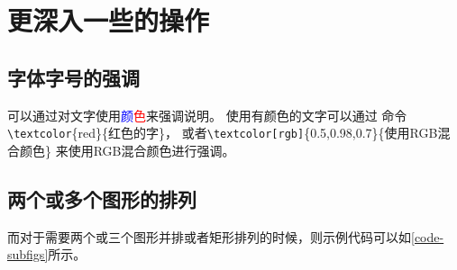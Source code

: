 \section{更深入一些的操作}
\label{sec-more}
\subsection{字体字号的强调}
\label{subsec-morefont}
可以通过对文字使用\textcolor{blue}{颜}\textcolor{red}{色}来强调说明。
使用\textcolor[rgb]{0.5,0.95,0.96}{有颜色的文字}可以通过
命令\texttt{\textbackslash textcolor}\{red\}\{红色的字\}，
或者\texttt{\textbackslash textcolor[rgb]}\{0.5,0.98,0.7\}\{使用RGB混合颜色\}
来\textcolor[rgb]{0.5,0.98,0.7}{使用RGB混合颜色}进行强调。

\subsection{两个或多个图形的排列}
\label{subsec-morefig}
而对于需要两个或三个图形并排或者矩形排列的时候，则示例代码可以如\ref{code-subfigs}所示。
